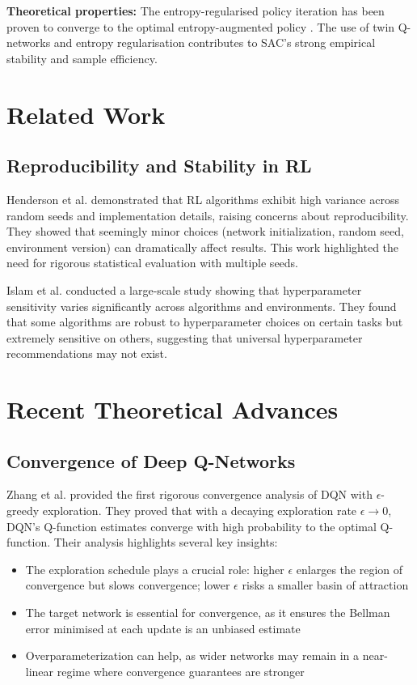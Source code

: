 \documentclass[12pt,a4paper]{report}
\begin{document}
\textbf{Theoretical properties:} The entropy-regularised policy iteration has been proven to converge to the optimal entropy-augmented policy \cite{haarnoja2018sac}. The use of twin Q-networks and entropy regularisation contributes to SAC's strong empirical stability and sample efficiency.

\section{Related Work}

\subsection{Reproducibility and Stability in RL}

Henderson et al. \cite{henderson2018deep} demonstrated that RL algorithms exhibit high variance across random seeds and implementation details, raising concerns about reproducibility. They showed that seemingly minor choices (network initialization, random seed, environment version) can dramatically affect results. This work highlighted the need for rigorous statistical evaluation with multiple seeds.

Islam et al. \cite{islam2017reproducibility} conducted a large-scale study showing that hyperparameter sensitivity varies significantly across algorithms and environments. They found that some algorithms are robust to hyperparameter choices on certain tasks but extremely sensitive on others, suggesting that universal hyperparameter recommendations may not exist.

\section{Recent Theoretical Advances}

\subsection{Convergence of Deep Q-Networks}

Zhang et al. \cite{zhang2023convergence} provided the first rigorous convergence analysis of DQN with $\epsilon$-greedy exploration. They proved that with a decaying exploration rate $\epsilon \rightarrow 0$, DQN's Q-function estimates converge with high probability to the optimal Q-function. Their analysis highlights several key insights:

\begin{itemize}
    \item The exploration schedule plays a crucial role: higher $\epsilon$ enlarges the region of convergence but slows convergence; lower $\epsilon$ risks a smaller basin of attraction
    \item The target network is essential for convergence, as it ensures the Bellman error minimised at each update is an unbiased estimate
    \item Overparameterization can help, as wider networks may remain in a near-linear regime where convergence guarantees are stronger
\end{itemize}
\end{document}
